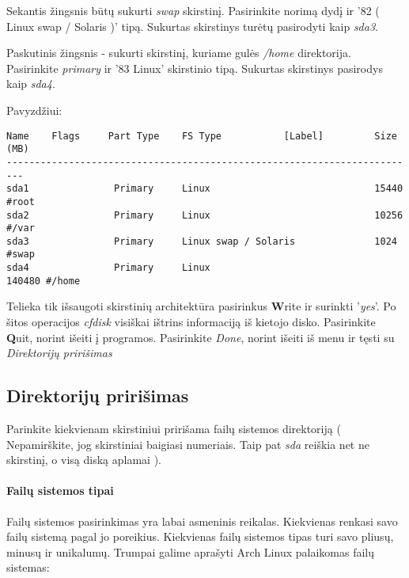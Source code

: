 Sekantis žingsnis būtų sukurti \textsl{swap} skirstinį. Pasirinkite
norimą dydį ir '82 ( Linux swap / Solaris )' tipą. Sukurtas skirstinys
turėtų pasirodyti kaip \textsl{sda3}.

Paskutinis žingsnis - sukurti skirstinį, kuriame gulės \textsl{/home}
direktorija. Pasirinkite \textsl{primary} ir '83 Linux' skirstinio
tipą. Sukurtas skirstinys pasirodys kaip \textsl{sda4}.

Pavyzdžiui:

\begin{verbatim}
Name    Flags     Part Type    FS Type           [Label]         Size (MB)
-------------------------------------------------------------------------
sda1               Primary     Linux                             15440 #root
sda2               Primary     Linux                             10256 #/var
sda3               Primary     Linux swap / Solaris              1024  #swap
sda4               Primary     Linux                             140480 #/home
\end{verbatim}

Telieka tik išsaugoti skirstinių architektūra pasirinkus
\textbf{W}rite ir surinkti '\textsl{yes}'. Po šitos operacijos
\textsl{cfdisk} visiškai ištrins informaciją iš kietojo
disko. Pasirinkite \textbf{Q}uit, norint išeiti į
programos. Pasirinkite \textsl{Done}, norint išeiti iš menu ir tęsti
su \textsl{Direktorijų pririšimas}

\subsection{Direktorijų pririšimas}

Parinkite kiekvienam skirstiniui pririšama failų sistemos
direktoriją ( Nepamirškite, jog skirstiniai baigiasi numeriais. Taip
pat \textsl{sda} reiškia net ne skirstinį, o visą diską aplamai ).

\paragraph{Failų sistemos tipai}

Failų sistemos pasirinkimas yra labai asmeninis reikalas. Kiekvienas
renkasi savo failų sistemą pagal jo poreikius. Kiekvienas failų
sistemos tipas turi savo pliusų, minusų ir unikalumų. Trumpai galime
aprašyti Arch Linux palaikomas failų sistemas:

